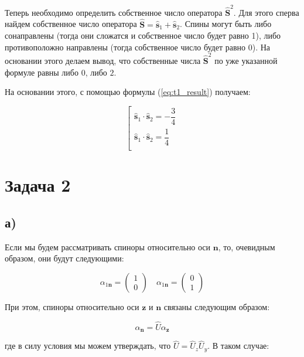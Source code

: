 \documentclass[a4paper, 12pt]{article}
\begin{document}
Теперь необходимо определить собственное число оператора $\hat{\mathbf{S}}^2$. Для этого сперва найдем собственное число оператора $\hat{\mathbf{S}} = \hat{\mathbf{s}}_1 + \hat{\mathbf{s}}_2$. Спины могут быть либо сонаправлены (тогда они сложатся и собственное число будет равно 1), либо противоположно направлены (тогда собственное число будет равно 0). На основании этого делаем вывод, что собственные числа $\hat{\mathbf{S}}^2$ по уже указанной формуле равны либо $0$, либо $2$.

На основании этого, с помощью формулы (\ref{eq:t1_result}) получаем:

\begin{equation*}
	\boxed{
	\left[ \begin{array}{lr}
	\hat{\mathbf{s}}_1 \cdot \hat{\mathbf{s}}_2 = -\dfrac{3}{4}\\
	\hat{\mathbf{s}}_1 \cdot \hat{\mathbf{s}}_2 = \dfrac{1}{4}\\
	\end{array}
	\right.}
\end{equation*}

\section*{Задача 2}
\subsection*{а)}

Если мы будем рассматривать спиноры относительно оси $\mathbf{n}$, то, очевидным образом, они будут следующими:

\begin{equation*}
	\alpha_{1\mathbf{n}} = 
	\begin{pmatrix}
		1\\
		0
	\end{pmatrix}
	\quad
	\alpha_{1\mathbf{n}} = 
	\begin{pmatrix}
		0\\
		1
	\end{pmatrix}
\end{equation*} 

При этом, спиноры относительно оси $\mathbf{z}$ и $\mathbf{n}$ связаны следующим образом:

\begin{equation}
	\alpha_{\mathbf{n}} = \hat{U} \alpha_\mathbf{z}
	\label{eq:main_2}
\end{equation}

где в силу условия мы можем утверждать, что $\hat{U} = \hat{U}_z \hat{U}_y$. В таком случае:
\end{document}
